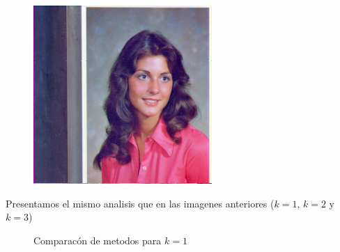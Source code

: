 \begin{figure}[H]
\centering
\includegraphics[scale=0.50]{fotos/rostro/orig.png}
\end{figure}

Presentamos el mismo analisis que en las imagenes anteriores ($k=1$, $k=2$ y $k=3$)

\begin{figure}[H]
    \centering
    \qquad
    \qquad
    \caption{Comparacón de metodos para $k = 1$}%
    \label{fig:example}%
\end{figure}

